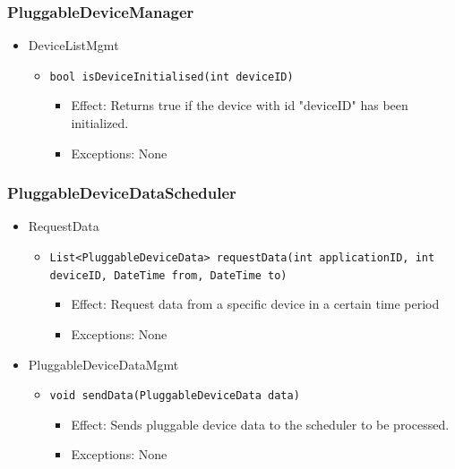     \subsubsection{PluggableDeviceManager}
        \begin{itemize}
        	\item DeviceListMgmt
        	\begin{itemize}
        		\item \texttt{bool isDeviceInitialised(int deviceID)}
        		\begin{itemize}
        			\item Effect: Returns true if the device with id "deviceID" has been initialized.
        			\item Exceptions: None
        		\end{itemize}
        	\end{itemize}
        \end{itemize}

    \subsubsection{PluggableDeviceDataScheduler}
        \begin{itemize}
            \item RequestData
            \begin{itemize}
                \item \texttt{List<PluggableDeviceData> requestData(int applicationID, int deviceID, DateTime from, DateTime to)}
                \begin{itemize}
                    \item Effect: Request data from a specific device in a certain time period
                    \item Exceptions: None
                \end{itemize}
            \end{itemize}

            \item PluggableDeviceDataMgmt
            \begin{itemize}
                \item \texttt{void sendData(PluggableDeviceData data)}
                \begin{itemize}
                    \item Effect: Sends pluggable device data to the scheduler to be processed.
                    \item Exceptions: None
                \end{itemize}
            \end{itemize}
        \end{itemize}

